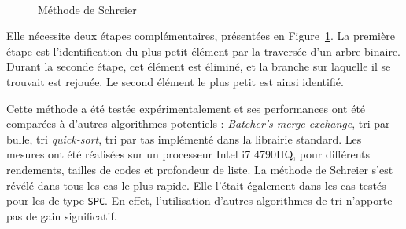 \begin{figure}[t]
\centering
{}
\\
\caption{Méthode de Schreier}
\label{fig:schreier_sort}
\end{figure}
Elle nécessite deux étapes complémentaires, présentées en Figure~\ref{fig:schreier_sort}. La première étape est l'identification du plus petit élément par la traversée d'un arbre binaire. Durant la seconde étape, cet élément est éliminé, et la branche sur laquelle il se trouvait est rejouée. Le second élément le plus petit est ainsi identifié.


Cette méthode a été testée expérimentalement et ses performances ont été comparées à d'autres algorithmes potentiels : \textit{Batcher's merge exchange}, tri par bulle, tri \textit{quick-sort}, tri par tas implémenté dans la librairie standard. Les mesures ont été réalisées sur un processeur Intel i7 4790HQ, pour différents rendements, tailles de codes et profondeur de liste. La méthode de Schreier s'est révélé dans tous les cas le plus rapide. Elle l'était également dans les cas testés pour les \noeuds de type \texttt{SPC}. En effet, l'utilisation d'autres algorithmes de tri n'apporte pas de gain significatif.


